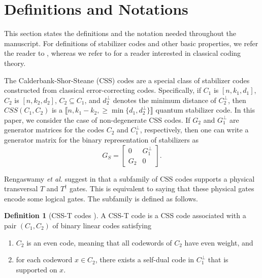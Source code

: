 \documentclass{amsart}
\theoremstyle{definition}
\newtheorem{definition}[theorem]{Definition}
\begin{document}
\section{Definitions and Notations}\label{s:def+not}

This section states the definitions and the notation needed throughout the manuscript. For definitions of stabilizer codes and other basic properties, we refer the reader to \cite{lidar_brun_2013,gottesman1997stabilizer}, whereas we refer to \cite{huffman_pless_2003} for a reader interested in classical coding theory.

The Calderbank-Shor-Steane (CSS) codes \cite{CSofCSS,SofCSS} are a special class of stabilizer codes constructed from classical error-correcting codes. Specifically,  if $C_1$ is  $[n,k_1,d_1]$, $C_2$ is  $[n,k_2,d_2]$, $C_2\subseteq C_1$, and $d_2^\perp$ denotes the minimum distance of $C_2^\perp$, then $CSS(C_1,C_2)$ is a $\llbracket n, k_1-k_2, \geq \min\{d_1,d_2^\perp\}\rrbracket$ quantum stabilizer code. In this paper, we consider the case of non-degenerate CSS codes. If $G_2$ and $G_1^\perp$ are generator matrices for the codes $C_2$ and $C_1^\perp$, respectively, then one can write a generator matrix for the binary representation of stabilizers as 
\[G_S = \left[\begin{array}{c|c} 0  & G_1^\perp \\ \hline G_2 & 0\end{array}\right].\]

Rengaswamy \emph{et al.} suggest in \cite{CSS-T-it,CSS-T-isit} that a subfamily of CSS codes supports a physical transversal $T$ and $T^\dagger$ gates. This is equivalent to saying that these physical gates encode some logical gates. The subfamily is defined as follows.

\begin{definition}[CSS-T codes \cite{CSS-T-isit}] \label{d:csst}
A CSS-T code is a CSS code associated with a pair $(C_1, C_2)$ of binary linear codes satisfying 
\begin{enumerate} 
\item $C_2$ is an even code, meaning that all codewords of $C_2$ have even weight, and
\item for each codeword $x \in C_2$, there exists a self-dual code in $C_1^\perp$ that is supported on $x$. 
\end{enumerate}
\end{definition}
\end{document}
